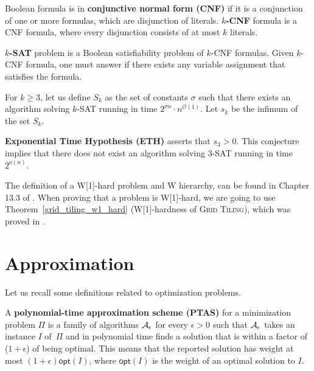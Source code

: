 \begin{defi}
\label{definition:cnf}
Boolean formula is in \textbf{conjunctive normal form (CNF)} if
it is a conjunction of one or more formulas,
which are disjunction of literals.
\textbf{$k$-CNF} formula is a CNF formula, where
every disjunction consists of at most $k$ literals.
\end{defi}

\begin{defi}
\textbf{\textsc{$k$-SAT}} problem is 
a Boolean satisfiability problem of $k$-CNF formulas.
Given $k$-CNF formula, one must answer if there
exists any variable assignment that satisfies the formula.
\end{defi}

\begin{defi}
For $k \ge 3$, let us define $S_k$ as the set of constants $\sigma$
such that there exists an algorithm solving \textsc{$k$-SAT} running in time
$2^{\sigma n} \cdot n^{\mathcal{O}(1)}$.
Let $s_k$ be the infimum  of the set $S_k$.

\textbf{Exponential Time Hypothesis (ETH)} asserts
that $s_3 > 0$. This conjecture implies that
there does not exist an algorithm solving \textsc{3-SAT}
running in time $2^{o(n)}$.
\end{defi}

The definition of a W[1]-hard problem and W hierarchy,
can be found in Chapter 13.3 of \cite{platypus_book}.
When proving that a problem is W[1]-hard,
we are going to use Theorem~\ref{grid_tiling_w1_hard}
(W[1]-hardness of \textsc{Grid Tiling}),
which was proved in \cite{marx_grid_tiling}.

\section{Approximation}

Let us recall some definitions related to optimization problems.

\newcommand{\opt}{\mathsf{opt}}

\begin{defi}
A \textbf{polynomial-time approximation scheme (PTAS)}
for a minimization problem $\Pi$
is a family of algorithms $\cal{A}_\epsilon$ for
every $\epsilon > 0$
such that $\cal{A}_\epsilon$ takes an instance $I$ of~$\Pi$
and in polynomial time
finds a solution that is within a factor
of ($1+\epsilon$) of being optimal.
This means that the reported solution has weight at most
$(1+\epsilon)\opt(I)$, where $\opt(I)$ is the weight
of an optimal solution to $I$.
\end{defi}

